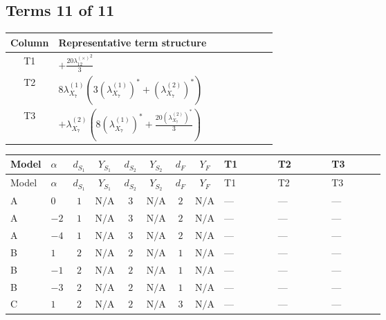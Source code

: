 \documentclass[8pt]{article}
\begin{document}
\begin{landscape}
\subsection*{Terms 11 of 11}
\begin{center}
\begin{tabular}{@{}c >{\raggedright\arraybackslash}p{0.82\linewidth}@{}}
\toprule
Column & Representative term structure \\
\midrule
T1 & \(\displaystyle +\frac{20 {\lambda_{12}^{(\times)}}^2}{3}\) \\
\midrule
T2 & \(\displaystyle 8 {\lambda_{X_{7}}^{(1)}} (3 \left({\lambda_{X_{7}}^{(1)}}\right)^{*}+\left({\lambda_{X_{7}}^{(2)}}\right)^{*})\) \\
\midrule
T3 & \(\displaystyle +{\lambda_{X_{7}}^{(2)}} \left(8 \left({\lambda_{X_{7}}^{(1)}}\right)^{*}+\frac{20 \left({\lambda_{X_{7}}^{(2)}}\right)^{*}}{3}\right)\) \\
\midrule
\bottomrule
\end{tabular}
\end{center}
\smallskip
\tiny
\begin{longtable}{@{}llcccccc >{\raggedright\arraybackslash}p{0.21\linewidth} >{\raggedright\arraybackslash}p{0.21\linewidth} >{\raggedright\arraybackslash}p{0.21\linewidth}@{}}
\toprule
Model & $\alpha$ & $d_{S_1}$ & $Y_{S_1}$ & $d_{S_2}$ & $Y_{S_2}$ & $d_F$ & $Y_F$ & T1 & T2 & T3 \\
\midrule
\endfirsthead
\toprule
Model & $\alpha$ & $d_{S_1}$ & $Y_{S_1}$ & $d_{S_2}$ & $Y_{S_2}$ & $d_F$ & $Y_F$ & T1 & T2 & T3 \\
\midrule
\endhead
A & $0$ & $1$ & $\text{N/A}$ & $3$ & $\text{N/A}$ & $2$ & $\text{N/A}$ & --- & --- & --- \\
\midrule
A & $-2$ & $1$ & $\text{N/A}$ & $3$ & $\text{N/A}$ & $2$ & $\text{N/A}$ & --- & --- & --- \\
\midrule
A & $-4$ & $1$ & $\text{N/A}$ & $3$ & $\text{N/A}$ & $2$ & $\text{N/A}$ & --- & --- & --- \\
\midrule
B & $1$ & $2$ & $\text{N/A}$ & $2$ & $\text{N/A}$ & $1$ & $\text{N/A}$ & --- & --- & --- \\
\midrule
B & $-1$ & $2$ & $\text{N/A}$ & $2$ & $\text{N/A}$ & $1$ & $\text{N/A}$ & --- & --- & --- \\
\midrule
B & $-3$ & $2$ & $\text{N/A}$ & $2$ & $\text{N/A}$ & $1$ & $\text{N/A}$ & --- & --- & --- \\
\midrule
C & $1$ & $2$ & $\text{N/A}$ & $2$ & $\text{N/A}$ & $3$ & $\text{N/A}$ & --- & --- & --- \\

\end{longtable}
\end{landscape}
\end{document}
